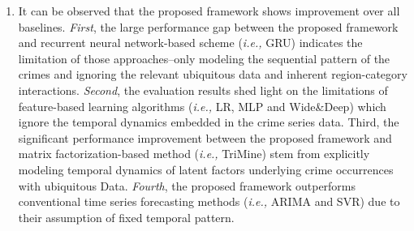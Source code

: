 \begin{enumerate}
    \item It can be observed that the proposed framework shows improvement over all baselines. 
    \emph{First}, the large performance gap between the proposed framework and recurrent 
    neural network-based scheme (\emph{i.e.,} GRU) indicates the limitation of those 
    approaches–only modeling the sequential pattern of
    the crimes and ignoring the relevant ubiquitous data and inherent
    region-category interactions. \emph{Second}, the evaluation results shed
    light on the limitations of feature-based learning algorithms (\emph{i.e.,}
    LR, MLP and Wide\&Deep) which ignore the temporal dynamics embedded in the crime series 
    data. Third, the significant performance improvement between the proposed framework and 
    matrix factorization-based method (\emph{i.e.,} TriMine) stem from explicitly modeling 
    temporal dynamics of latent factors underlying crime occurrences with ubiquitous Data. 
    \emph{Fourth}, the proposed framework outperforms conventional time series forecasting 
    methods (\emph{i.e.,} ARIMA and SVR) due to their assumption of fixed temporal pattern.     
\end{enumerate}

